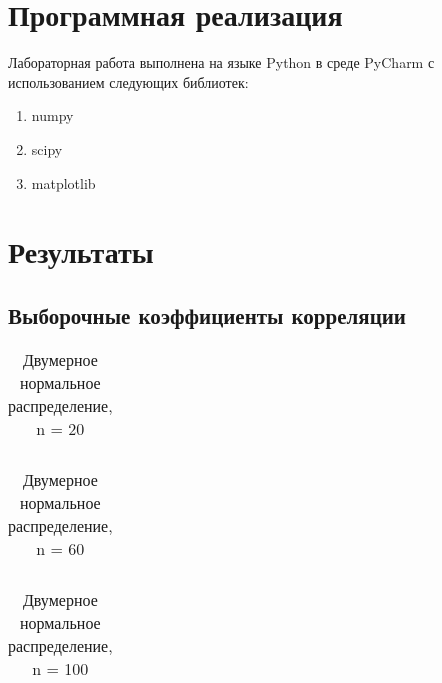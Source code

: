\documentclass[a4paper]{article}
\begin{document}
    \section{Программная реализация}
        Лабораторная работа выполнена на языке Python в среде PyCharm с использованием следующих библиотек:
        \begin{enumerate}
            \item numpy
            \item scipy
            \item matplotlib
        \end{enumerate}

    \section{Результаты}
        \subsection{Выборочные коэффициенты корреляции}
            \begin{table}[H]
                \centering
                \begin{tabular}{| c | c | c | c |}
                    \hline
                    
                \end{tabular}{}
                \caption{Двумерное нормальное распределение, n = 20}
                \label{tab:n20}
            \end{table}


            \begin{table}[H]
                \centering
                \begin{tabular}{| c | c | c | c |}
                     \hline
                    
                \end{tabular}{}
                \caption{Двумерное нормальное распределение, n = 60}
                \label{tab:n60}
            \end{table}



            \begin{table}[H]
                \centering
                \begin{tabular}{| c | c | c | c |}
                     \hline
                    
                \end{tabular}{}
                \caption{Двумерное нормальное распределение, n = 100}
                \label{tab:n100}
            \end{table}
\end{document}
